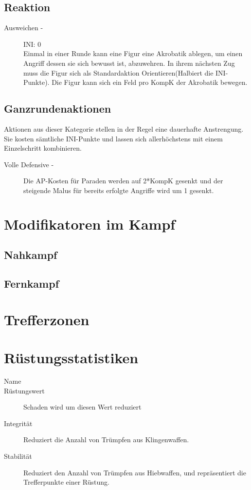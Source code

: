 \documentclass[a4paper,12pt,oneside]{book}
\begin{document}
\section{Reaktion}
\begin{description}
\item[Ausweichen -] INI: 0
\\Einmal in einer Runde kann eine Figur eine Akrobatik ablegen, um einen Angriff dessen sie sich bewusst ist, abzuwehren. In ihrem nächsten Zug muss die Figur sich als Standardaktion Orientieren(Halbiert die INI-Punkte). Die Figur kann sich ein Feld pro KompK der Akrobatik bewegen.
\end{description}

\section{Ganzrundenaktionen}
Aktionen aus dieser Kategorie stellen in der Regel eine dauerhafte Anstrengung. Sie kosten sämtliche INI-Punkte und lassen sich allerhöchstens mit einem Einzelschritt kombinieren.
\begin{description}
\item[Volle Defensive -] Die AP-Kosten für Paraden werden auf 2*KompK gesenkt und der steigende Malus für bereits erfolgte Angriffe wird um 1 gesenkt.
\end{description}


\chapter{Modifikatoren im Kampf}

\section{Nahkampf}

\section{Fernkampf}

\chapter{Trefferzonen}

\chapter{Rüstungsstatistiken}
\begin{description}
\item[Name]
\item[Rüstungswert]Schaden wird um diesen Wert reduziert
\item[Integrität]Reduziert die Anzahl von Trümpfen aus Klingenwaffen.
\item[Stabilität]Reduziert den Anzahl von Trümpfen aus Hiebwaffen, und repräsentiert die Trefferpunkte einer Rüstung.
\end{description}
\end{document}
